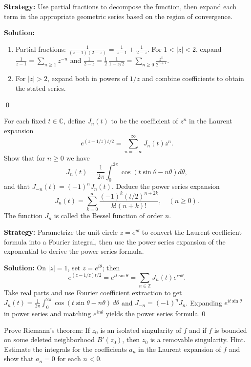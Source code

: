 \noindent\textbf{Strategy:} Use partial fractions to decompose the function, then expand each term in the appropriate geometric series based on the region of convergence.

\bigskip\noindent\textbf{Solution:}
\begin{enumerate}[label=(\alph*)]
\item Partial fractions: $\frac{1}{(z-1)(2-z)}=\frac{1}{z-1}+\frac{1}{2-z}$. For $1<|z|<2$, expand $\frac{1}{z-1}=\sum_{n\ge1}z^{-n}$ and $\frac{1}{2-z}=\frac{1}{2}\,\frac{1}{1-z/2}=\sum_{n\ge0}\frac{z^n}{2^{n+1}}$.
\item For $|z|>2$, expand both in powers of $1/z$ and combine coefficients to obtain the stated series.
\end{enumerate}\qed


\begin{problembox}
For each fixed \( t \in \mathbb{C} \), define \( J_n(t) \) to be the coefficient of \( z^n \) in the Laurent expansion
\[ e^{(z - 1/z)t/2} = \sum_{n=-\infty}^{\infty} J_n(t) z^n. \]
Show that for \( n \geq 0 \) we have
\[ J_n(t) = \frac{1}{2\pi} \int_0^{2\pi} \cos (t \sin \theta - n \theta) d\theta, \]
and that \( J_{-n}(t) = (-1)^n J_n(t) \). Deduce the power series expansion
\[ J_n(t) = \sum_{k=0}^{\infty} \frac{(-1)^k (t/2)^{n + 2k}}{k! (n + k)!}, \quad (n \geq 0). \]
The function \( J_n \) is called the Bessel function of order \( n \).
\end{problembox}

\noindent\textbf{Strategy:} Parametrize the unit circle \( z = e^{i\theta} \) to convert the Laurent coefficient formula into a Fourier integral, then use the power series expansion of the exponential to derive the power series formula.

\bigskip\noindent\textbf{Solution:}
On $|z|=1$, set $z=e^{i\theta}$; then
\[e^{(z-1/z)t/2}=e^{i t\sin\theta}=\sum_{n\in\mathbb Z} J_n(t)e^{in\theta}.
\]
Take real parts and use Fourier coefficient extraction to get $J_n(t)=\frac{1}{2\pi}\int_0^{2\pi}\cos(t\sin\theta-n\theta)\,d\theta$ and $J_{-n}=(-1)^nJ_n$. Expanding $e^{i t\sin\theta}$ in power series and matching $e^{in\theta}$ yields the power series formula.\qed


\begin{problembox}
Prove Riemann's theorem: If \( z_0 \) is an isolated singularity of \( f \) and if \( f \) is bounded on some deleted neighborhood \( B'(z_0) \), then \( z_0 \) is a removable singularity. Hint. Estimate the integrals for the coefficients \( a_n \) in the Laurent expansion of \( f \) and show that \( a_n = 0 \) for each \( n < 0 \).
\end{problembox}

